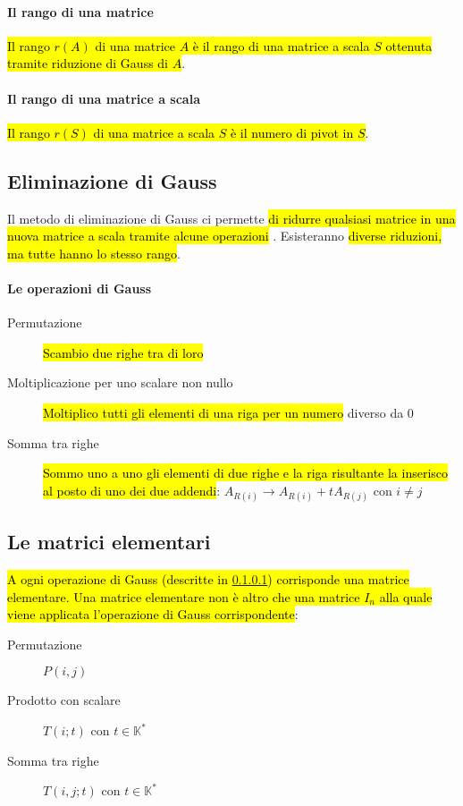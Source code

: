 \paragraph{Il rango di una matrice} \hl{Il rango $r(A)$ di una matrice $A$ è il
rango di una matrice a scala $S$ ottenuta tramite riduzione di Gauss di $A$}.

\paragraph{Il rango di una matrice a scala} \hl{Il rango $r(S)$ di una matrice
a scala $S$ è il numero di pivot in $S$}.

\subsection{Eliminazione di Gauss}
Il metodo di eliminazione di Gauss ci permette \hl{di ridurre qualsiasi matrice
in una nuova matrice a scala tramite alcune operazioni }. Esisteranno \hl{diverse
riduzioni, ma tutte hanno lo stesso rango}.

\paragraph{Le operazioni di Gauss}\label{par:op-gauss}
\begin{description}
    \item[Permutazione] \hl{Scambio due righe tra di loro}
    \item[Moltiplicazione per uno scalare non nullo] \hl{Moltiplico tutti gli elementi
        di una riga per un numero} diverso da $0$
    \item[Somma tra righe] \hl{Sommo uno a uno gli elementi di due righe e la riga
        risultante la inserisco al posto di uno dei due addendi}:
        $A_{R(i)} \to A_{R(i)} + tA_{R(j)} \text{ con } i \neq j$
\end{description}

\subsection{Le matrici elementari}\label{sec:matrici-elementari}
\hl{A ogni operazione di Gauss (descritte in {\ref{par:op-gauss}}) corrisponde una
matrice elementare. Una matrice elementare non è altro che una matrice $I_n$
alla quale viene applicata l'operazione di Gauss corrispondente}:
\begin{description}
    \item[Permutazione] $P(i,j)$
    \item[Prodotto con scalare] $T(i; t)$ con $t \in \mathbb{K}^*$
    \item[Somma tra righe] $T(i,j;t)$ con $t \in \mathbb{K}^*$
\end{description}

